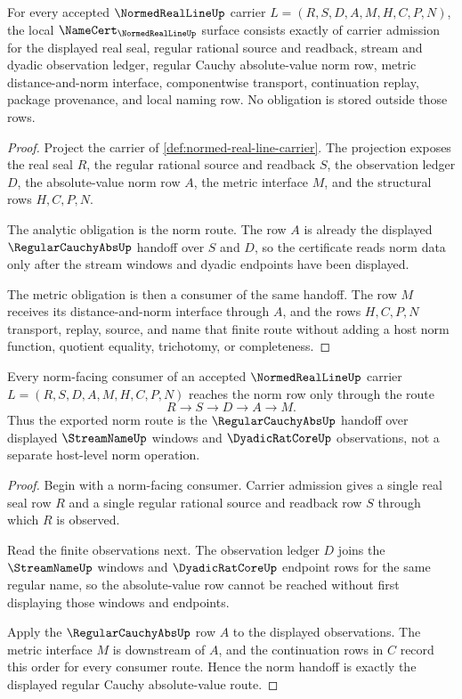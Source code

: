 \begin{theorem}
\label{thm:normed-real-line-namecert-obligations}
For every accepted $\NormedRealLineUp$ carrier $L=(R,S,D,A,M,H,C,P,N)$, the local $\NameCert_{\NormedRealLineUp}$ surface consists exactly of carrier admission for the displayed real seal, regular rational source and readback, stream and dyadic observation ledger, regular Cauchy absolute-value norm row, metric distance-and-norm interface, componentwise transport, continuation replay, package provenance, and local naming row. No obligation is stored outside those rows.
\end{theorem}
\begin{proof}
Project the carrier of \autoref{def:normed-real-line-carrier}. The projection exposes the real seal $R$, the regular rational source and readback $S$, the observation ledger $D$, the absolute-value norm row $A$, the metric interface $M$, and the structural rows $H,C,P,N$.

The analytic obligation is the norm route. The row $A$ is already the displayed $\RegularCauchyAbsUp$ handoff over $S$ and $D$, so the certificate reads norm data only after the stream windows and dyadic endpoints have been displayed.

The metric obligation is then a consumer of the same handoff. The row $M$ receives its distance-and-norm interface through $A$, and the rows $H,C,P,N$ transport, replay, source, and name that finite route without adding a host norm function, quotient equality, trichotomy, or completeness.
\end{proof}

\begin{theorem}
\label{thm:normed-real-line-regular-cauchy-norm-handoff}
Every norm-facing consumer of an accepted $\NormedRealLineUp$ carrier $L=(R,S,D,A,M,H,C,P,N)$ reaches the norm row only through the route
$$
R \longrightarrow S \longrightarrow D \longrightarrow A \longrightarrow M .
$$
Thus the exported norm route is the $\RegularCauchyAbsUp$ handoff over displayed $\StreamNameUp$ windows and $\DyadicRatCoreUp$ observations, not a separate host-level norm operation.
\end{theorem}
\begin{proof}
Begin with a norm-facing consumer. Carrier admission gives a single real seal row $R$ and a single regular rational source and readback row $S$ through which $R$ is observed.

Read the finite observations next. The observation ledger $D$ joins the $\StreamNameUp$ windows and $\DyadicRatCoreUp$ endpoint rows for the same regular name, so the absolute-value row cannot be reached without first displaying those windows and endpoints.

Apply the $\RegularCauchyAbsUp$ row $A$ to the displayed observations. The metric interface $M$ is downstream of $A$, and the continuation rows in $C$ record this order for every consumer route. Hence the norm handoff is exactly the displayed regular Cauchy absolute-value route.
\end{proof}

